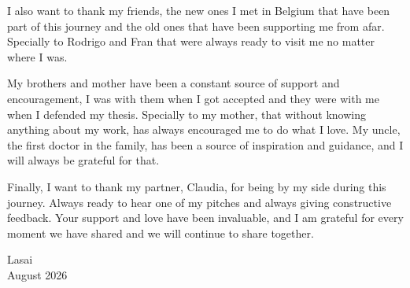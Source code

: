  I also want to thank my friends, the new ones I met in Belgium that have been part of this journey and the old ones that have been supporting me from afar. Specially to Rodrigo and Fran that were always ready to visit me no matter where I was. 

My brothers and mother have been a constant source of support and encouragement, I was with them when I got accepted and they were with me when I defended my thesis. Specially to my mother, that without knowing anything about my work, has always encouraged me to do what I love. My uncle, the first doctor in the family, has been a source of inspiration and guidance, and I will always be grateful for that. 

Finally, I want to thank my partner, Claudia, for being by my side during this journey. Always ready to hear one of my pitches and always giving constructive feedback. Your support and love have been invaluable, and I am grateful for every moment we have shared and we will continue to share together.





{\raggedleft
Lasai \\
August 2026 \\
}